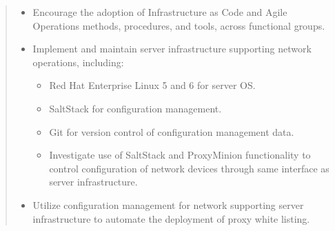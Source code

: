 \begin{quote}
\begin{itemize}
\item Encourage the adoption of Infrastructure as Code and Agile Operations
methods, procedures, and tools, across functional groups.
\item Implement and maintain server infrastructure supporting network
operations, including:
\begin{itemize}
\item Red Hat Enterprise Linux 5 and 6 for server OS.
\item SaltStack for configuration management.
\item Git for version control of configuration management data.
\item Investigate use of SaltStack and ProxyMinion functionality to control
configuration of network devices through same interface as server
infrastructure.
\end{itemize}
\item Utilize configuration management for network supporting server
infrastructure to automate the deployment of proxy white listing.
\end{itemize}
\end{quote}
